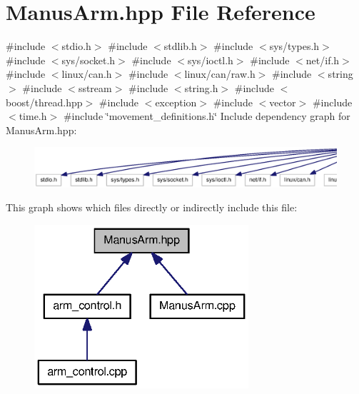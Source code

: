 \section{\-Manus\-Arm.\-hpp \-File \-Reference}
\label{ManusArm_8hpp}
{\ttfamily \#include $<$stdio.\-h$>$}\*
{\ttfamily \#include $<$stdlib.\-h$>$}\*
{\ttfamily \#include $<$sys/types.\-h$>$}\*
{\ttfamily \#include $<$sys/socket.\-h$>$}\*
{\ttfamily \#include $<$sys/ioctl.\-h$>$}\*
{\ttfamily \#include $<$net/if.\-h$>$}\*
{\ttfamily \#include $<$linux/can.\-h$>$}\*
{\ttfamily \#include $<$linux/can/raw.\-h$>$}\*
{\ttfamily \#include $<$string$>$}\*
{\ttfamily \#include $<$sstream$>$}\*
{\ttfamily \#include $<$string.\-h$>$}\*
{\ttfamily \#include $<$boost/thread.\-hpp$>$}\*
{\ttfamily \#include $<$exception$>$}\*
{\ttfamily \#include $<$vector$>$}\*
{\ttfamily \#include $<$time.\-h$>$}\*
{\ttfamily \#include \char`\"{}movement\-\_\-definitions.\-h\char`\"{}}\*
\-Include dependency graph for \-Manus\-Arm.\-hpp\-:\nopagebreak
\begin{figure}[H]
\begin{center}
\leavevmode
\includegraphics[width=350pt]{ManusArm_8hpp__incl}
\end{center}
\end{figure}
\-This graph shows which files directly or indirectly include this file\-:\nopagebreak
\begin{figure}[H]
\begin{center}
\leavevmode
\includegraphics[width=225pt]{ManusArm_8hpp__dep__incl}
\end{center}
\end{figure}
